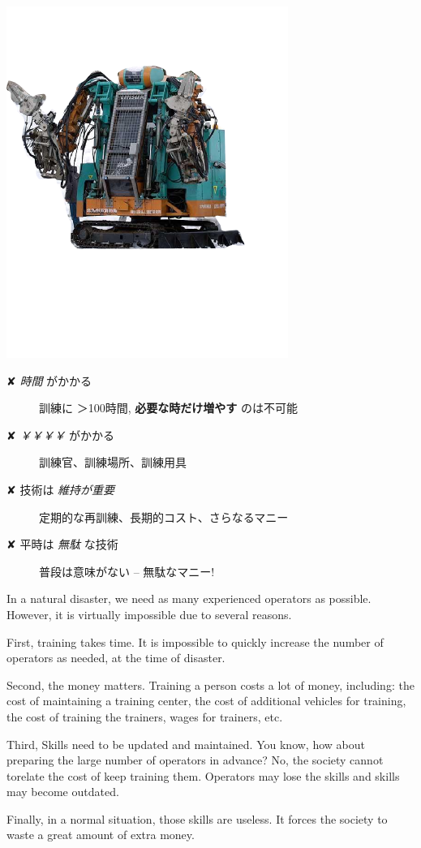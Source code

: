 \begin{container-fluid}
\begin{row-fluid}
\begin{span4}
\includegraphics{img/rescue/1.png}
\end{span4}
\begin{span8}


\begin{description}
\item[{✘ \emph{時間} がかかる}] 訓練に ＞100時間, \textbf{必要な時だけ増やす} のは不可能
\item[{✘ \emph{￥￥￥￥} がかかる}] 訓練官、訓練場所、訓練用具
\item[{✘ 技術は \emph{維持が重要}}] 定期的な再訓練、長期的コスト、さらなるマニー
\item[{✘ 平時は \emph{無駄} な技術}] 普段は意味がない -- 無駄なマニー!
\end{description}
\end{span8}
\end{row-fluid}
\end{container-fluid}

\begin{resume}
In a natural disaster, we need as many experienced operators as possible.
However, it is virtually impossible due to several reasons. 

First, training takes time.
It is impossible to quickly increase the number of operators as needed, at the time of disaster.

Second, the money matters.
Training a person costs a lot of money, including: the cost of maintaining
a training center, the cost of additional vehicles for training, the cost
of training the trainers, wages for trainers, etc.

Third, Skills need to be updated and maintained.
You know, how about preparing the large number of operators in advance?
No, the society cannot torelate the cost of keep training them.
Operators may lose the skills and skills may become outdated.

Finally, in a normal situation, those skills are useless.
It forces the society to waste a great amount of extra money.
\end{resume}


